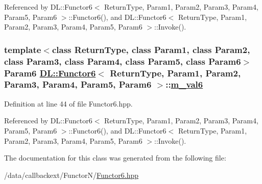 Referenced by DL::Functor6$<$ Return\-Type, Param1, Param2, Param3, Param4, Param5, Param6 $>$::Functor6(), and DL::Functor6$<$ Return\-Type, Param1, Param2, Param3, Param4, Param5, Param6 $>$::Invoke().\hypertarget{classDL_1_1Functor6_r6}{
\subsubsection[m\_\-val6]{\setlength{\rightskip}{0pt plus 5cm}template$<$class Return\-Type, class Param1, class Param2, class Param3, class Param4, class Param5, class Param6$>$ Param6 \hyperlink{classDL_1_1Functor6}{DL::Functor6}$<$ Return\-Type, Param1, Param2, Param3, Param4, Param5, Param6 $>$::\hyperlink{classDL_1_1Functor6_r6}{m\_\-val6}}}
\label{classDL_1_1Functor6_r6}




Definition at line 44 of file Functor6.hpp.

Referenced by DL::Functor6$<$ Return\-Type, Param1, Param2, Param3, Param4, Param5, Param6 $>$::Functor6(), and DL::Functor6$<$ Return\-Type, Param1, Param2, Param3, Param4, Param5, Param6 $>$::Invoke().

The documentation for this class was generated from the following file:\begin{CompactItemize}
\item 
/data/callbackext/Functor\-N/\hyperlink{Functor6_8hpp}{Functor6.hpp}\end{CompactItemize}
